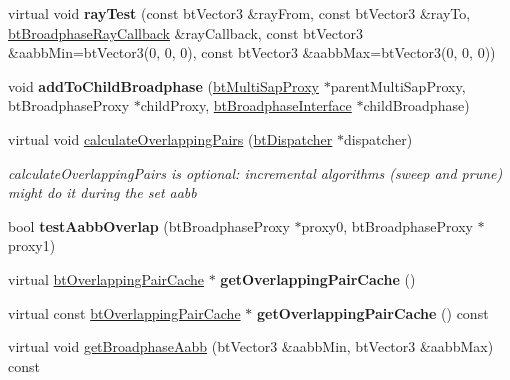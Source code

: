 \begin{DoxyCompactItemize}
\item 
\mbox{\label{classbtMultiSapBroadphase_a9b9c84e52caffd481ffccee3d6ac9b83}} 
virtual void {\bfseries ray\+Test} (const bt\+Vector3 \&ray\+From, const bt\+Vector3 \&ray\+To, \hyperlink{structbtBroadphaseRayCallback}{bt\+Broadphase\+Ray\+Callback} \&ray\+Callback, const bt\+Vector3 \&aabb\+Min=bt\+Vector3(0, 0, 0), const bt\+Vector3 \&aabb\+Max=bt\+Vector3(0, 0, 0))
\item 
\mbox{\label{classbtMultiSapBroadphase_a96ca3208c2bf2610ce76a168f7bb62c5}} 
void {\bfseries add\+To\+Child\+Broadphase} (\hyperlink{structbtMultiSapBroadphase_1_1btMultiSapProxy}{bt\+Multi\+Sap\+Proxy} $\ast$parent\+Multi\+Sap\+Proxy, bt\+Broadphase\+Proxy $\ast$child\+Proxy, \hyperlink{classbtBroadphaseInterface}{bt\+Broadphase\+Interface} $\ast$child\+Broadphase)
\item 
virtual void \hyperlink{classbtMultiSapBroadphase_a922708408ba589a5ab9b487c679ff6fb}{calculate\+Overlapping\+Pairs} (\hyperlink{classbtDispatcher}{bt\+Dispatcher} $\ast$dispatcher)
\begin{DoxyCompactList}\small\item\em calculate\+Overlapping\+Pairs is optional\+: incremental algorithms (sweep and prune) might do it during the set aabb \end{DoxyCompactList}\item 
\mbox{\label{classbtMultiSapBroadphase_a38bcbcf1378407f7c748d24cc276f3b1}} 
bool {\bfseries test\+Aabb\+Overlap} (bt\+Broadphase\+Proxy $\ast$proxy0, bt\+Broadphase\+Proxy $\ast$proxy1)
\item 
\mbox{\label{classbtMultiSapBroadphase_a081272661ef30baa9942de6ce385465e}} 
virtual \hyperlink{classbtOverlappingPairCache}{bt\+Overlapping\+Pair\+Cache} $\ast$ {\bfseries get\+Overlapping\+Pair\+Cache} ()
\item 
\mbox{\label{classbtMultiSapBroadphase_a227731d8131a9bdb12b10c02232cc162}} 
virtual const \hyperlink{classbtOverlappingPairCache}{bt\+Overlapping\+Pair\+Cache} $\ast$ {\bfseries get\+Overlapping\+Pair\+Cache} () const
\item 
virtual void \hyperlink{classbtMultiSapBroadphase_a37a11b7ee2889d80adaf5add6fffe782}{get\+Broadphase\+Aabb} (bt\+Vector3 \&aabb\+Min, bt\+Vector3 \&aabb\+Max) const

\end{DoxyCompactItemize}
